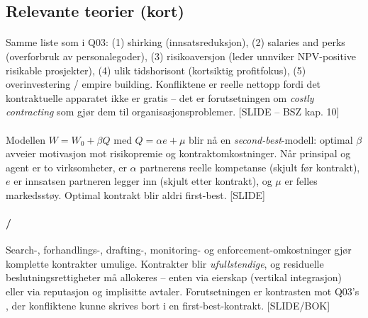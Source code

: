 \subsection*{Relevante teorier (kort)}

\paragraph{\quad\SThree}
Samme liste som i Q03: (1) shirking (innsatsreduksjon), (2) salaries and perks (overforbruk av personalegoder), (3) risikoaversjon (leder unnviker NPV-positive risikable prosjekter), (4) ulik tidshorisont (kortsiktig profitfokus), (5) overinvestering / empire building. Konfliktene er reelle nettopp fordi det kontraktuelle apparatet ikke er gratis -- det er forutsetningen om \emph{costly contracting} som gjør dem til organisasjonsproblemer. [SLIDE -- BSZ kap. 10]

\paragraph{\quad\SThree}
Modellen $W = W_0 + \beta Q$ med $Q = \alpha e + \mu$ blir nå en \emph{second-best}-modell: optimal $\beta$ avveier motivasjon mot risikopremie og kontraktomkostninger. Når prinsipal og agent er to virksomheter, er $\alpha$ partnerens reelle kompetanse (skjult før kontrakt), $e$ er innsatsen partneren legger inn (skjult etter kontrakt), og $\mu$ er felles markedsstøy. Optimal kontrakt blir aldri first-best. [SLIDE]

\paragraph{\quad\SOne/\SThree}
Search-, forhandlings-, drafting-, monitoring- og enforcement-omkostninger gjør komplette kontrakter umulige. Kontrakter blir \emph{ufullstendige}, og residuelle beslutningsrettigheter må allokeres -- enten via eierskap (vertikal integrasjon) eller via reputasjon og implisitte avtaler. Forutsetningen er kontrasten mot Q03's , der konfliktene kunne skrives bort i en first-best-kontrakt. [SLIDE/BOK]

